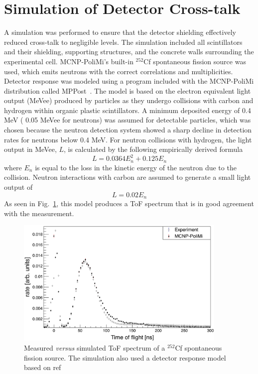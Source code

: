 \section{Simulation of Detector Cross-talk}
A simulation was performed to ensure that the detector shielding effectively reduced cross-talk to negligible levels.
The simulation included all scintillators and their shielding, supporting structures, and the concrete walls surrounding the experimental cell.
MCNP-PoliMi's built-in $^{252}$Cf spontaneous fission source was used, which emits neutrons with the correct correlations and multiplicities.
Detector response was modeled using a program included with the MCNP-PoliMi distribution called MPPost~\cite{MPPost}.
The model is based on the electron equivalent light output (MeVee) produced by particles as they undergo collisions with carbon and hydrogen within organic plastic scintillators.
A minimum deposited energy of 0.4 MeV ( 0.05 MeVee for neutrons) was assumed for detectable particles, which was chosen because the neutron detection system showed a sharp decline in detection rates for neutrons below 0.4 MeV.
For neutron collisions with hydrogen, the light output in MeVee, $L$, is calculated by the following empirically derived formula
\begin{displaymath}
L = 0.0364 E_n^2 +  0.125 E_n
\end{displaymath}
where $E_n$ is equal to the loss in the kinetic energy of the neutron due to the collision.
Neutron interactions with carbon are assumed to generate a small light output of
\begin{displaymath}
L = 0.02 E_n
\end{displaymath}
As seen in Fig.~\ref{fig:Cf252MCNPVsEXP}, this model produces a ToF spectrum that is in good agreement with the measurement.
\begin{figure}
    \centering
    \includegraphics[width = 0.9\textwidth]{Content/Errors/Cf252MCNPVsEXP.png}
    \caption{Measured \emph{versus} simulated ToF spectrum of a $^{252}$Cf spontaneous fission source. 
    The simulation also used a detector response model based on ref~\cite{MPPost}}
    \label{fig:Cf252MCNPVsEXP}
\end{figure}

